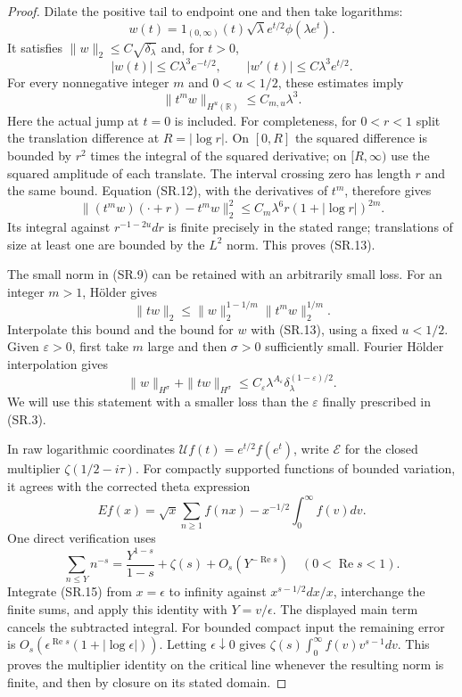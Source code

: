 \begin{proof}
Dilate the positive tail to endpoint one and then take
logarithms:
\[
       w(t)=1_{(0,\infty)}(t)
                   \sqrt\lambda e^{t/2}\phi(\lambda e^t).
                                                        \tag{SR.11}
\]
It satisfies $\|w\|_2\leq C\sqrt{\delta_\lambda}$ and,
for $t>0$,
\[
 |w(t)|\leq C\lambda^3e^{-t/2},\qquad
 |w'(t)|\leq C\lambda^3e^{t/2}.                    \tag{SR.12}
\]
For every nonnegative integer $m$ and $0<u<1/2$,
these estimates imply
\[
                  \|t^mw\|_{H^u(\mathbb R)}
                                  \leq C_{m,u}\lambda^3.
                                                        \tag{SR.13}
\]
Here the actual jump at $t=0$ is included.
For completeness, for $0<r<1$ split the translation
difference at $R=|\log r|$.
On $[0,R]$ the squared difference is bounded by $r^2$
times the integral of the squared derivative; on
$[R,\infty)$ use the squared amplitude of each translate.
The interval crossing zero has length $r$ and the same
bound.  Equation (SR.12), with the derivatives of $t^m$,
therefore gives
\[
 \|(t^mw)(\cdot+r)-t^mw\|_2^2
        \leq C_m\lambda^6 r(1+|\log r|)^{2m}.
\]
Its integral against $r^{-1-2u}dr$ is finite precisely
in the stated range; translations of size at least one
are bounded by the $L^2$ norm.  This proves (SR.13).

The small norm in (SR.9) can be retained with an
arbitrarily small loss.  For an integer $m>1$, H\"older
gives
\[
 \|tw\|_2\leq
       \|w\|_2^{1-1/m}\|t^mw\|_2^{1/m}.
\]
Interpolate this bound and the bound for $w$ with
(SR.13), using a fixed $u<1/2$.
Given $\varepsilon>0$, first take $m$ large and then
$\sigma>0$ sufficiently small.  Fourier H\"older
interpolation gives
\[
 \|w\|_{H^\sigma}+\|tw\|_{H^\sigma}
       \leq C_\varepsilon\lambda^{A_\varepsilon}
                    \delta_\lambda^{(1-\varepsilon)/2}.
                                                        \tag{SR.14}
\]
We will use this statement with a smaller loss than
the $\varepsilon$ finally prescribed in (SR.3).

In raw logarithmic coordinates $\mathcal Uf(t)=e^{t/2}f(e^t)$,
write $\mathcal E$ for the closed multiplier
$\zeta(1/2-i\tau)$.
For compactly supported functions of bounded variation,
it agrees with the corrected theta expression
\[
 E f(x)=\sqrt x\sum_{n\geq1}f(nx)
                      -x^{-1/2}\int_0^\infty f(v)dv.
                                                        \tag{SR.15}
\]
One direct verification uses
\[
 \sum_{n\leq Y}n^{-s}
       =\frac{Y^{1-s}}{1-s}+\zeta(s)+O_s(Y^{-\operatorname{Re}s})
                  \quad(0<\operatorname{Re}s<1).
\]
Integrate (SR.15) from $x=\epsilon$ to infinity
against $x^{s-1/2}dx/x$, interchange the finite sums,
and apply this identity with $Y=v/\epsilon$.
The displayed main term cancels the subtracted integral.
For bounded compact input the remaining error is
$O_s(\epsilon^{\operatorname{Re}s}(1+|\log\epsilon|))$.
Letting $\epsilon\downarrow0$ gives
$\zeta(s)\int_0^\infty f(v)v^{s-1}dv$.
This proves the multiplier identity on the critical line
whenever the resulting norm is finite, and then by
closure on its stated domain.


\end{proof}
